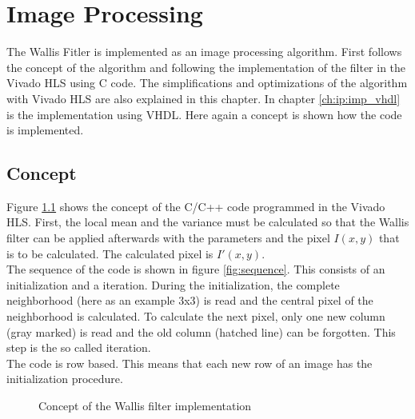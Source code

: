 %
%
\chapter{Image Processing}  \label{chapt:image_processing}
The Wallis Fitler is implemented as an image processing algorithm. First follows the concept of the algorithm and following the implementation of the filter in the Vivado HLS using C code. The simplifications and optimizations of the algorithm with Vivado HLS are also explained in this chapter. In chapter \ref{ch:ip:imp_vhdl} is the implementation using VHDL. Here again a concept is shown how the code is implemented.

\section{Concept} \label{ch:ip:concept}
Figure \ref{fig:concept} shows the concept of the C/C++ code programmed in the Vivado HLS. First, the local mean and the variance must be calculated so that the Wallis filter can be applied afterwards with the parameters and the pixel $I(x,y)$ that is to be calculated. The calculated pixel is $I'(x,y)$. \\
The sequence of the code is shown in figure \ref{fig:sequence}. This consists of an initialization and a iteration. During the initialization, the complete neighborhood (here as an example 3x3) is read and the central pixel of the neighborhood is calculated. To calculate the next pixel, only one new column (gray marked) is read and the old column (hatched line) can be forgotten. This step is the so called iteration.\\
The code is row based. This means that each new row of an image has the initialization procedure.


\begin{figure}[tb!]
    \centering
    \begin{adjustbox}{max width=\textwidth}
        
    \end{adjustbox}
    \caption{Concept of the Wallis filter implementation}
    \label{fig:concept}
\end{figure}

